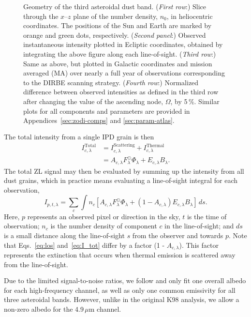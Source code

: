 \documentclass[twocolumn]{aa}
\begin{document}
\begin{figure}
  \caption{Geometry of the third asteroidal dust band. (\textit{First row}:)
    Slice through the $x$--$z$ plane of the number density, $n_{0}$,
    in heliocentric coordinates. The positions of the Sun and Earth
    are marked by orange and green dots, respectively. (\textit{Second
    panel}:) Observed instantaneous intensity plotted in Ecliptic
    coordinates, obtained by integrating the above figure along each
    line-of-sight. (\textit{Third row}:) Same as above, but plotted in
  Galactic coordinates and mission averaged (MA) over nearly a full year of
  observations corresponding to the DIRBE scanning strategy. 
  (\textit{Fourth row}:) Normalized difference between observed
  intensities as defined in the third row after changing the value of
  the ascending node, $\Omega$, by 5\,\%. Similar plots for all
  components and parameters are provided in 
  Appendices~\ref{sec:zodi-comps} and \ref{sec:param-atlas}.}
  \label{fig:band3}
\end{figure}

The total intensity from a single IPD grain is then
\begin{align}\label{eq:I_tot}
    I^\mathrm{Total}_{c, \lambda} &= I^\mathrm{Scattering}_{c,\lambda} + I^\mathrm{Thermal}_{c,\lambda}\\
    &= A_{c, \lambda} F_\lambda^\odot \Phi_\lambda + E_{c,\lambda} B_\lambda.
\end{align}
The total ZL signal may then be evaluated by summing up the intensity
from all dust grains, which in practice means evaluating a line-of-sight 
integral for each observation,
\begin{equation}\label{eq:los}
    I_{p,t, \lambda} = \sum_c \int n_c \left[  A_{c, \lambda} F_\lambda^\odot \Phi_\lambda + \left( 1 - A_{c, \lambda} \right) E_{c,\lambda} B_\lambda \right]\,ds.
\end{equation}
Here, $p$ represents an observed pixel or direction in the sky, $t$ is
the time of observation; $n_c$ is the number density of component $c$
in the line-of-sight; and $ds$ is a small distance along the
line-of-sight $s$ from the observer and towards $p$. Note that
Eqs.~\eqref{eq:los} and~\eqref{eq:I_tot} differ by a factor (1 -
$A_{c, \lambda}$). This factor represents the extinction that occurs
when thermal emission is scattered away from the line-of-sight.

Due to the limited signal-to-noise ratios, we follow
\citet{Kelsall1998} and only fit one overall albedo for each
high-frequency channel, as well as only one common emissivity for all
three asteroidal bands. However, unlike in the original K98 analysis,
we allow a non-zero albedo for the 4.9\,$\mu$m channel.
\end{document}
